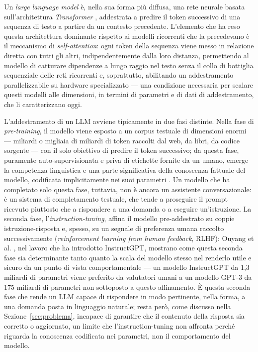 Un \emph{large language model} è, nella sua forma più diffusa, una rete neurale basata sull'architettura
\emph{Transformer} \cite{vaswani2017attention}, addestrata a predire il token successivo di una sequenza di testo a
partire da un contesto precedente. L'elemento che ha reso questa architettura dominante rispetto ai modelli
ricorrenti che la precedevano è il meccanismo di \emph{self-attention}: ogni token della sequenza viene messo in
relazione diretta con tutti gli altri, indipendentemente dalla loro distanza, permettendo al modello di catturare
dipendenze a lungo raggio nel testo senza il collo di bottiglia sequenziale delle reti ricorrenti e, soprattutto,
abilitando un addestramento parallelizzabile su hardware specializzato --- una condizione necessaria per scalare
questi modelli alle dimensioni, in termini di parametri e di dati di addestramento, che li caratterizzano oggi.

L'addestramento di un LLM avviene tipicamente in due fasi distinte. Nella fase di \emph{pre-training}, il modello
viene esposto a un corpus testuale di dimensioni enormi --- miliardi o migliaia di miliardi di token raccolti dal web,
da libri, da codice sorgente --- con il solo obiettivo di predire il token successivo; da questa fase, puramente
auto-supervisionata e priva di etichette fornite da un umano, emerge la competenza linguistica e una parte
significativa della conoscenza fattuale del modello, codificata implicitamente nei suoi parametri \cite{zhao2023survey}.
Un modello che ha completato solo questa fase, tuttavia, non è ancora un assistente conversazionale: è un sistema di
completamento testuale, che tende a proseguire il prompt ricevuto piuttosto che a rispondere a una domanda o a
eseguire un'istruzione. La seconda fase, l'\emph{instruction-tuning}, affina il modello pre-addestrato su coppie
istruzione-risposta e, spesso, su un segnale di preferenza umana raccolto successivamente (\emph{reinforcement
learning from human feedback}, RLHF): Ouyang et al. \cite{ouyang2022instructgpt}, nel lavoro che ha introdotto
InstructGPT, mostrano come questa seconda fase sia determinante tanto quanto la scala del modello stesso nel renderlo
utile e sicuro da un punto di vista comportamentale --- un modello InstructGPT da 1,3 miliardi di parametri viene
preferito da valutatori umani a un modello GPT-3 da 175 miliardi di parametri non sottoposto a questo affinamento. È
questa seconda fase che rende un LLM capace di rispondere in modo pertinente, nella forma, a una domanda posta in
linguaggio naturale; resta però, come discusso nella Sezione~\ref{sec:problema}, incapace di garantire che il
contenuto della risposta sia corretto o aggiornato, un limite che l'instruction-tuning non affronta perché riguarda
la conoscenza codificata nei parametri, non il comportamento del modello.

